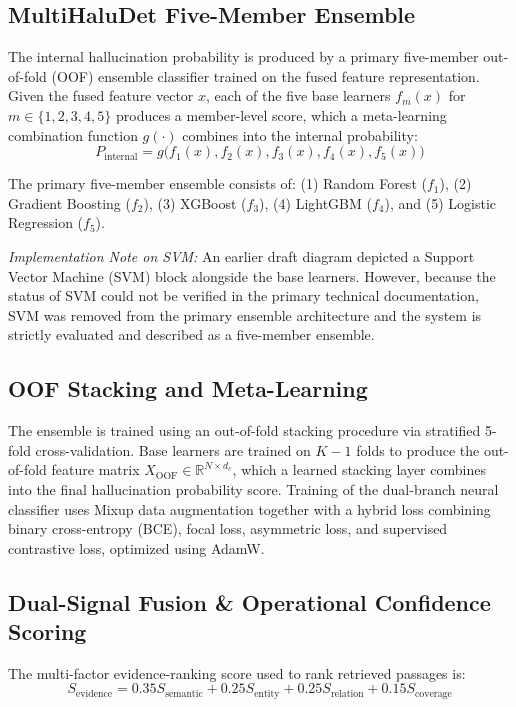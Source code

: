 \documentclass[conference]{IEEEtran}
\begin{document}
\subsection{MultiHaluDet Five-Member Ensemble}
The internal hallucination probability is produced by a primary five-member out-of-fold (OOF) ensemble classifier trained on the fused feature representation. Given the fused feature vector $x$, each of the five base learners $f_m(x)$ for $m \in \{1, 2, 3, 4, 5\}$ produces a member-level score, which a meta-learning combination function $g(\cdot)$ combines into the internal probability:
\begin{equation}
P_{\text{internal}} = g\big(f_1(x), f_2(x), f_3(x), f_4(x), f_5(x)\big)
\end{equation}

The primary five-member ensemble consists of: (1) Random Forest ($f_1$), (2) Gradient Boosting ($f_2$), (3) XGBoost ($f_3$), (4) LightGBM ($f_4$), and (5) Logistic Regression ($f_5$).

\textit{Implementation Note on SVM:} An earlier draft diagram depicted a Support Vector Machine (SVM) block alongside the base learners. However, because the status of SVM could not be verified in the primary technical documentation, SVM was removed from the primary ensemble architecture and the system is strictly evaluated and described as a five-member ensemble.

\subsection{OOF Stacking and Meta-Learning}
The ensemble is trained using an out-of-fold stacking procedure via stratified 5-fold cross-validation. Base learners are trained on $K-1$ folds to produce the out-of-fold feature matrix $X_{\text{OOF}} \in \mathbb{R}^{N \times d_c}$, which a learned stacking layer combines into the final hallucination probability score. Training of the dual-branch neural classifier uses Mixup data augmentation together with a hybrid loss combining binary cross-entropy (BCE), focal loss, asymmetric loss, and supervised contrastive loss, optimized using AdamW.

\subsection{Dual-Signal Fusion \& Operational Confidence Scoring}
The multi-factor evidence-ranking score used to rank retrieved passages is:
\begin{equation}
S_{\text{evidence}} = 0.35 S_{\text{semantic}} + 0.25 S_{\text{entity}} + 0.25 S_{\text{relation}} + 0.15 S_{\text{coverage}}
\end{equation}
\end{document}
